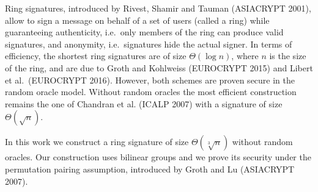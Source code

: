 Ring signatures, introduced by Rivest, Shamir and Tauman (ASIACRYPT 2001), allow to sign a message on behalf of a set of users (called a ring) while guaranteeing authenticity, i.e.~only members of the ring can produce valid signatures, and anonymity, i.e.~signatures hide the actual signer. In terms of efficiency, the shortest ring signatures are of size $\Theta(\log n)$, where $n$ is the size of the ring, and are due to Groth and Kohlweiss (EUROCRYPT 2015) and Libert et al.~(EUROCRYPT 2016). However, both schemes are proven secure in the random oracle model. Without random oracles the most efficient construction remains the one of Chandran et al. (ICALP 2007) with a signature of size $\Theta(\sqrt{n})$.

In this work we construct a ring signature of size $\Theta(\sqrt[3]{n})$ without random oracles. Our construction uses bilinear groups and we prove its security under the permutation pairing assumption, introduced by Groth and Lu (ASIACRYPT 2007).
